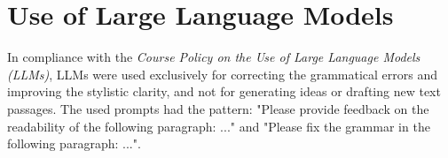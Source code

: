 \appendix
\section{Use of Large Language Models}
In compliance with the \textit{Course Policy on the Use of Large Language Models (LLMs)}, LLMs were used exclusively for correcting the grammatical errors and improving the stylistic clarity, and not for generating ideas or drafting new text passages. The used prompts had the pattern: "Please provide feedback on the readability of the following paragraph: ..." and "Please fix the grammar in the following paragraph: ...".
